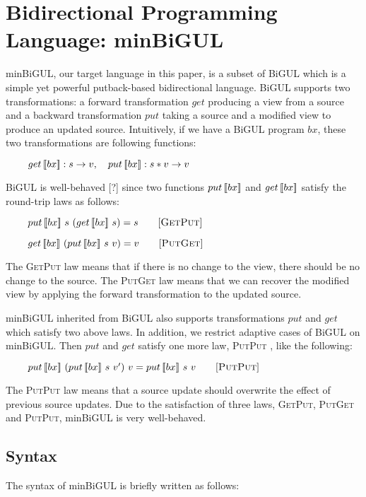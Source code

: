 \section{Bidirectional Programming Language: minBiGUL}

minBiGUL, our target language in this paper, is a subset of BiGUL which is a simple yet powerful putback-based bidirectional language. BiGUL supports two transformations: a forward transformation $get$ producing a view from a source and a backward transformation $put$ taking a source and a modified view to produce an updated source. Intuitively, if we have a BiGUL program $bx$, these two transformations are following functions:

    $\hspace*{3mm} \ \quad get \, [\![bx]\!] : s \to v, \quad put \, [\![bx]\!] : s * v \to v$

BiGUL is well-behaved [?] since two functions $put \, [\![bx]\!]$ and $get \, [\![bx]\!]$ satisfy the round-trip laws as follows:
    
    $\hspace*{3mm} \ \quad put \, [\![bx]\!] \ s \ (get \, [\![bx]\!] \ s) = s \qquad [\textsc{GetPut}]$
    
    $\hspace*{3mm} \ \quad get \, [\![bx]\!] \ (put \, [\![bx]\!] \ s \ v) = v \qquad [\textsc{PutGet}]$

The \textsc{GetPut} \cite{Pacheco:2014:MCP:2543728.2543737} law means that if there is no change to the view, there should be no change to the source. The \textsc{PutGet} \cite{Pacheco:2014:MCP:2543728.2543737} law means that we can recover the modified view by applying the forward transformation to the updated source.

minBiGUL inherited from BiGUL also supports transformations $put$ and $get$ which satisfy two above laws. In addition, we restrict adaptive cases of BiGUL on minBiGUL. Then $put$ and $get$ satisfy one more law, \textsc{PutPut} \cite{putput}, like the following:

    $\hspace*{3mm} \ \quad put \, [\![bx]\!] \ (put \, [\![bx]\!] \ s \ v') \ v = put \, [\![bx]\!] \ s \ v \qquad [\textsc{PutPut}]$

The \textsc{PutPut} law means that a source update should overwrite the effect of previous source updates. Due to the satisfaction of three laws, \textsc{GetPut}, \textsc{PutGet} and \textsc{PutPut}, minBiGUL is very well-behaved.

\subsection{Syntax}

The syntax of minBiGUL is briefly written as follows:

